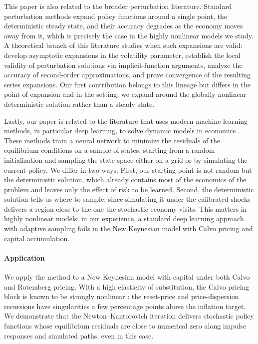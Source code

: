 \documentclass[12pt]{article}
\begin{document}
This paper is also related to the broader perturbation literature. Standard
perturbation methods \citep{schmitt2004solving, fernandez2016solution} expand
policy functions around a single point, the deterministic steady state, and
their accuracy degrades as the economy moves away from it, which is precisely
the case in the highly nonlinear models we study. A theoretical branch of this
literature studies when such expansions are valid: \citet{judd2001asymptotic}
develop asymptotic expansions in the volatility parameter,
\citet{jin2002perturbation} establish the local validity of perturbation
solutions via implicit-function arguments, \citet{kim2008calculating} analyze
the accuracy of second-order approximations, and \citet{lombardo2018theory}
prove convergence of the resulting series expansions. Our first contribution belongs to this lineage but differs in the point of
expansion and in the setting: we expand around the globally nonlinear
deterministic solution rather than a steady state.

Lastly, our paper is related to the literature that uses modern machine
learning methods, in particular deep learning, to solve dynamic models in
economics \citep{maliar2021deep, azinovic2022deep, kahou2021exploiting,
han2026deepham, kase2022estimating, barnett2023deep, fernandez2023financial,
jungerman2023dynamic, duarte2024machine, payne2024deep}. These methods train a
neural network to minimize the residuals of the equilibrium conditions on a
sample of states, starting from a random initialization and sampling the state
space either on a grid or by simulating the current policy. We differ in two
ways. First, our starting point is not random but the deterministic solution,
which already contains most of the economics of the problem and leaves only
the effect of risk to be learned. Second, the deterministic solution tells us
where to sample, since simulating it under the calibrated shocks delivers a
region close to the one the stochastic economy visits. This matters in highly
nonlinear models: in our experience, a standard deep learning approach with
adaptive sampling fails in the New Keynesian model with Calvo pricing and
capital accumulation.

\paragraph{Application} We apply the method to a New Keynesian model with
capital under both Calvo and Rotemberg pricing. With a high elasticity of
substitution, the Calvo pricing block is known to be strongly nonlinear
\citep{ascari2014macroeconomics}: the reset-price and price-dispersion
recursions have singularities a few percentage points above the inflation target.
We demonstrate that the Newton--Kantorovich iteration delivers stochastic
policy functions whose equilibrium residuals are close to numerical zero
along impulse responses and simulated paths, even in this case.
\end{document}
